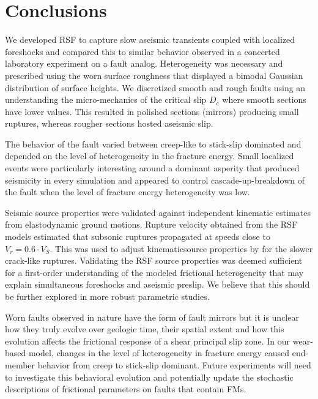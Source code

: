 \documentclass[preprint,1p, 10pt,authoryear]{elsarticle}
\begin{document}
\section{Conclusions}
We developed RSF to capture slow aseismic transients coupled with localized foreshocks and compared this to similar behavior observed in a concerted laboratory experiment on a fault analog. Heterogeneity was necessary and prescribed using the worn surface roughness that displayed a bimodal Gaussian distribution of surface heights. We discretized smooth and rough faults using an understanding the micro-mechanics of the critical slip $D_{c}$ where smooth sections have lower values. This resulted in polished sections (mirrors) producing small ruptures, whereas rougher sections hosted aseismic slip.  

The behavior of the fault varied between creep-like to stick-slip dominated and depended on the level of heterogeneity in the fracture energy. Small localized events were particularly interesting around a dominant asperity that produced seismicity in every simulation and appeared to control cascade-up-breakdown of the fault when the level of fracture energy heterogeneity was low. 

Seismic source properties were validated against independent kinematic estimates from elastodynamic ground motions. Rupture velocity obtained from the RSF models estimated that subsonic ruptures propagated at speeds close to $V_r = 0.6\cdot V_{S}$.  This was used to adjust kinematicsource properties by \citet{Selvadurai2019} for the slower crack-like ruptures. Validating the RSF source properties was deemed sufficient for a first-order understanding of the modeled frictional heterogeneity that may explain simultaneous foreshocks and aseismic preslip. We believe that this should be further explored in more robust parametric studies. 

Worn faults observed in nature have the form of fault mirrors but it is unclear how they truly evolve over geologic time, their spatial extent and how this evolution affects the frictional response of a shear principal slip zone. In our wear-based model, changes in the level of heterogeneity in fracture energy caused end-member behavior from creep to stick-slip dominant. Future experiments will need to investigate this behavioral evolution and potentially update the stochastic descriptions of frictional parameters on faults that contain FMs. 

\end{document}
